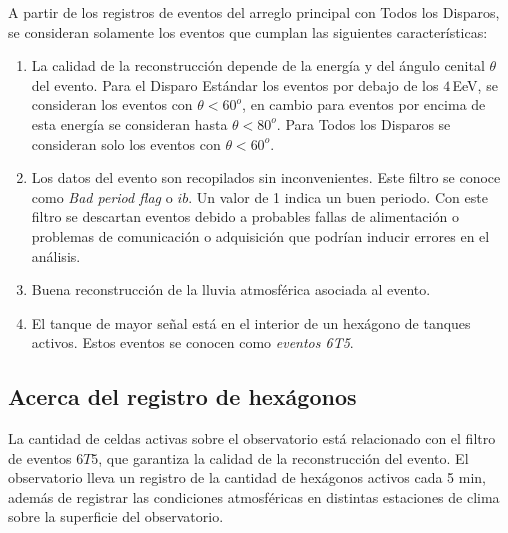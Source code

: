 A partir de los registros de eventos del arreglo principal con Todos los Disparos, se consideran solamente los eventos que cumplan las siguientes características:

    \begin{enumerate}
      \item La calidad de la reconstrucción depende de la energía y del ángulo cenital $\theta$ del evento.  Para el Disparo Estándar los eventos por debajo de los $4\,$EeV, se consideran los eventos con $\theta < 60^o$, en cambio para eventos por encima de esta energía se consideran hasta $\theta < 80^o$. Para Todos los Disparos se consideran solo los eventos con $\theta<60^o$.
      \item Los datos del evento son recopilados sin inconvenientes. Este filtro se conoce como \emph{Bad period flag} o $ib$. Un valor de 1 indica un buen periodo. Con este filtro se descartan eventos debido a probables fallas de alimentación o problemas de comunicación o adquisición que podrían inducir errores en el análisis.
      \item Buena reconstrucción de la lluvia atmosférica asociada al evento.
      \item El tanque de mayor señal está en el interior de un hexágono de tanques activos. Estos eventos se conocen como \textit{eventos 6T5}.
    \end{enumerate}


\subsection{Acerca del registro de hexágonos}\label{hexagonos_rate}

La cantidad de celdas  activas sobre el observatorio está relacionado con el filtro de eventos $6T5$, que garantiza la calidad de la reconstrucción del evento. El observatorio lleva un registro de la cantidad de hexágonos activos cada 5 min, además de registrar las condiciones atmosféricas en distintas estaciones de clima sobre la superficie del observatorio. 


